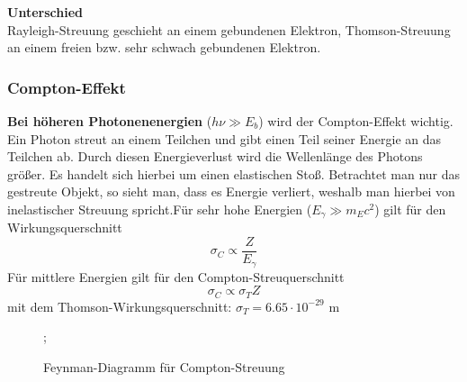 \documentclass[Ex4_Zusammenfassung.tex]{subfiles}
\begin{document}
\textbf{Unterschied}  \\ \newline
Rayleigh-Streuung geschieht an einem gebundenen Elektron, Thomson-Streuung an einem freien bzw. sehr schwach gebundenen Elektron. \newpage

\subsubsection{Compton-Effekt}
\textbf{Bei höheren Photonenenergien} ($ h \nu \gg E_b$) wird der Compton-Effekt wichtig. Ein Photon streut an einem Teilchen und gibt einen Teil seiner Energie an das Teilchen ab. Durch diesen Energieverlust wird die Wellenlänge des Photons größer.\newline
Es handelt sich hierbei um einen elastischen Stoß. Betrachtet man nur das gestreute Objekt, so sieht man, dass es Energie verliert, weshalb man hierbei von inelastischer Streuung spricht.Für sehr hohe Energien ($E_{\gamma} \gg m_E c^2$) gilt für den Wirkungsquerschnitt
\begin{equation}
\sigma_{C} \propto \frac{Z}{E_{\gamma}}
\end{equation}
Für mittlere Energien gilt für den Compton-Streuquerschnitt
\begin{equation}
\sigma_{C} \propto \sigma_{T} Z 
\end{equation}
mit dem Thomson-Wirkungsquerschnitt: $\sigma_{T} = 6.65 \cdot 10^{-29} $ m 

\begin{figure}[H]
	\centering
					;
		\caption{Feynman-Diagramm für Compton-Streuung}
	\end{figure}
	\newpage
\end{document}
